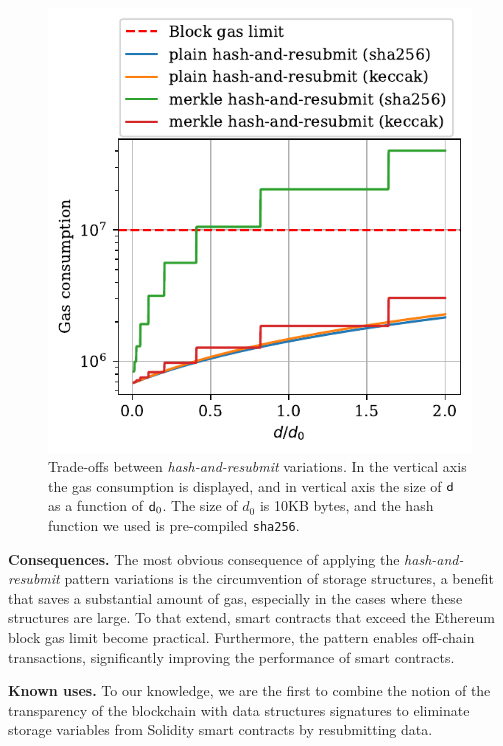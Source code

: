 \begin{figure}[h]
    \begin{center}
        \includegraphics[width=1\columnwidth]{figures/har-vs-mhar.pdf}
    \end{center}
    \caption{Trade-offs between \emph{hash-and-resubmit} variations. In the
    vertical axis the gas consumption is displayed, and in vertical axis the
    size of $\mathsf{d}$ as a function of $\mathsf{d}_0$. The size of $d_0$ is 10KB
    bytes, and the hash function we used is pre-compiled \texttt{sha256}.}
    \label{fig:har-vs-mhar}
\end{figure}

\noindent \textbf{Consequences.} The most obvious consequence of applying the
\emph{hash-and-resubmit} pattern variations is the circumvention of storage
structures, a benefit that saves a substantial amount of gas, especially in the
cases where these structures are large. To that extend, smart contracts that
exceed the Ethereum block gas limit become practical. Furthermore, the pattern
enables off-chain transactions, significantly improving the performance of
smart contracts.

\noindent \textbf{Known uses.} To our knowledge, we are the first to combine
the notion of the transparency of the blockchain with data structures
signatures to eliminate storage variables from Solidity smart contracts by
resubmitting data.

